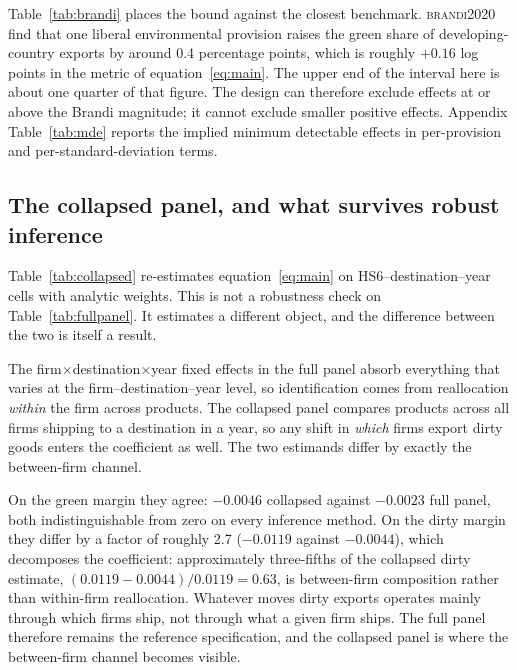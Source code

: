 \documentclass[11pt]{article}
\newcommand{\citet}[1]{\textsc{#1}}
\begin{document}
Table~\ref{tab:brandi} places the bound against the closest benchmark. \citet{brandi2020} find that
one liberal environmental provision raises the green share of developing-country exports by around
0.4 percentage points, which is roughly $+0.16$ log points in the metric of
equation~\eqref{eq:main}. The upper end of the interval here is about one quarter of that figure.
The design can therefore exclude effects at or above the Brandi magnitude; it cannot exclude
smaller positive effects. Appendix Table~\ref{tab:mde} reports the implied minimum detectable
effects in per-provision and per-standard-deviation terms.





\FloatBarrier
\subsection{The collapsed panel, and what survives robust inference}\label{sec:collapsed}

Table~\ref{tab:collapsed} re-estimates equation~\eqref{eq:main} on HS6--destination--year cells with
analytic weights. This is not a robustness check on Table~\ref{tab:fullpanel}. It estimates a
different object, and the difference between the two is itself a result.

The firm$\times$destination$\times$year fixed effects in the full panel absorb everything that
varies at the firm--destination--year level, so identification comes from reallocation
\emph{within} the firm across products. The collapsed panel compares products across all firms
shipping to a destination in a year, so any shift in \emph{which} firms export dirty goods enters
the coefficient as well. The two estimands differ by exactly the between-firm channel.

On the green margin they agree: $-0.0046$ collapsed against $-0.0023$ full panel, both
indistinguishable from zero on every inference method. On the dirty margin they differ by a factor
of roughly 2.7 ($-0.0119$ against $-0.0044$), which decomposes the coefficient: approximately
three-fifths of the collapsed dirty estimate, $(0.0119 - 0.0044)/0.0119 = 0.63$, is between-firm
composition rather than within-firm reallocation. Whatever moves dirty exports operates mainly
through which firms ship, not through what a given firm ships. The full panel therefore remains the
reference specification, and the collapsed panel is where the between-firm channel becomes visible.
\end{document}
